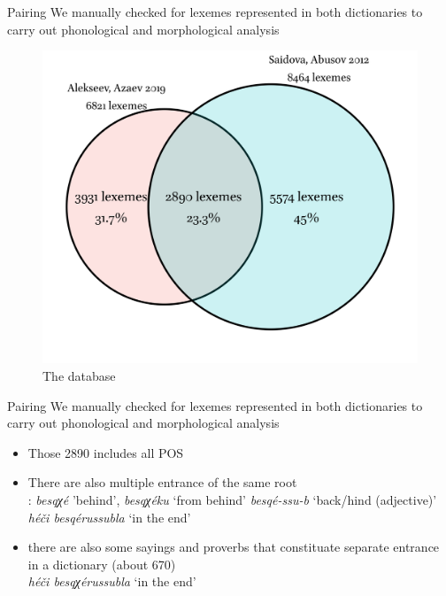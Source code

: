 \begin{frame}{Pairing}
We manually checked for lexemes represented in both dictionaries to carry out phonological and morphological analysis 
\begin{figure}[h]
\centering
\includegraphics[scale=0.45]{images/venn.png}
\caption{The database}
\end{figure}
\end{frame}

\begin{frame}{Pairing}
We manually checked for lexemes represented in both dictionaries to carry out phonological and morphological analysis 
\begin{itemize}
    \item Those 2890 includes all POS
    \item There are also multiple entrance of the same root\\
    \citet{alekseev2019}: \textit{besqχé}
     'behind', 
    \textit{besqχéku}
     `from behind' 
     \textit{besqé-ssu-b}
     `back/hind (adjective)'
     \textit{héči besqérussubla}
     `in the end'
    \item there are also some sayings and proverbs that constituate separate entrance in a dictionary (about 670) \\
     \textit{héči besqχérussubla}
    `in the end'
\end{itemize}
\end{frame}

